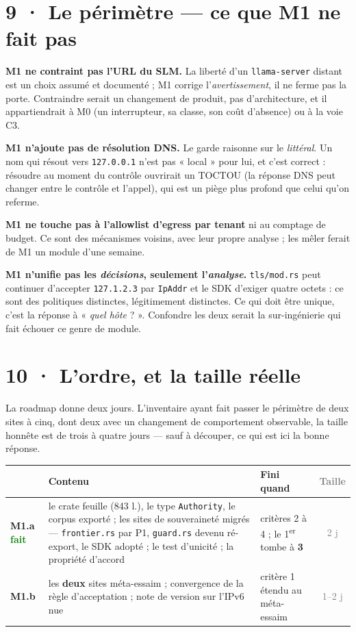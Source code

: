 \documentclass[10pt]{article}
\newcommand{\best}[1]{\textcolor{green}{\textbf{#1}}}
\newcommand{\sz}[1]{\textcolor{grey}{\small\textsf{#1}}}
\newcommand{\code}[1]{\texttt{\small #1}}
\begin{document}
\section{9 · Le périmètre --- ce que M1 ne fait pas}

\textbf{M1 ne contraint pas l'URL du SLM.} La liberté d'un \code{llama-server} distant est un choix
assumé et documenté ; M1 corrige l'\emph{avertissement}, il ne ferme pas la porte. Contraindre serait
un changement de produit, pas d'architecture, et il appartiendrait à M0 (un interrupteur, sa classe,
son coût d'absence) ou à la voie C3.

\textbf{M1 n'ajoute pas de résolution DNS.} Le garde raisonne sur le \emph{littéral}. Un nom qui
résout vers \code{127.0.0.1} n'est pas « local » pour lui, et c'est correct : résoudre au moment du
contrôle ouvrirait un TOCTOU (la réponse DNS peut changer entre le contrôle et l'appel), qui est un
piège plus profond que celui qu'on referme.

\textbf{M1 ne touche pas à l'allowlist d'egress par tenant} ni au comptage de budget. Ce sont des
mécanismes voisins, avec leur propre analyse ; les mêler ferait de M1 un module d'une semaine.

\textbf{M1 n'unifie pas les \emph{décisions}, seulement l'\emph{analyse}.} \code{tls/mod.rs} peut
continuer d'accepter \code{127.1.2.3} par \code{IpAddr} et le SDK d'exiger quatre octets : ce sont des
politiques distinctes, légitimement distinctes. Ce qui doit être unique, c'est la réponse à
« \emph{quel hôte} ? ». Confondre les deux serait la sur-ingénierie qui fait échouer ce genre de
module.

\section{10 · L'ordre, et la taille réelle}

La roadmap donne deux jours. L'inventaire ayant fait passer le périmètre de deux sites à cinq, dont
deux avec un changement de comportement observable, la taille honnête est de trois à quatre jours ---
sauf à découper, ce qui est ici la bonne réponse.

\begin{center}\small
\renewcommand{\arraystretch}{1.25}
\begin{tabular}{@{}l >{\raggedright\arraybackslash}p{9.3cm} >{\raggedright\arraybackslash}p{3.5cm} c@{}}
\toprule
& \textbf{Contenu} & \textbf{Fini quand} & \sz{Taille} \\
\midrule
\textbf{M1.a} \best{fait} & le crate feuille (843 l.), le type \code{Authority}, le corpus exporté ; les sites de souveraineté migrés --- \code{frontier.rs} par P1, \code{guard.rs} devenu ré-export, le SDK adopté ; le test d'unicité ; la propriété d'accord & critères 2 à 4 ; le 1\textsuperscript{er} tombe à \textbf{3} & \sz{2 j} \\
\textbf{M1.b} & les \textbf{deux} sites méta-essaim ; convergence de la règle d'acceptation ; note de version sur l'IPv6 nue & critère 1 étendu au méta-essaim & \sz{1--2 j} \\
\bottomrule
\end{tabular}
\end{center}
\end{document}

